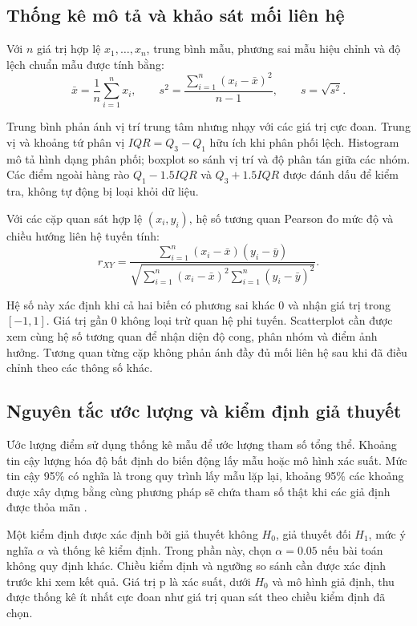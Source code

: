 \subsection{Thống kê mô tả và khảo sát mối liên hệ}

Với \(n\) giá trị hợp lệ \(x_1,\ldots,x_n\), trung bình mẫu, phương sai mẫu hiệu chỉnh và độ lệch chuẩn mẫu được tính bằng:
\nopagebreak[4]
\[
\bar{x}=\frac{1}{n}\sum_{i=1}^{n}x_i,\qquad
s^2=\frac{\sum_{i=1}^{n}(x_i-\bar{x})^2}{n-1},\qquad s=\sqrt{s^2}.
\]

Trung bình phản ánh vị trí trung tâm nhưng nhạy với các giá trị cực đoan. Trung vị và khoảng tứ phân vị \(IQR=Q_3-Q_1\) hữu ích khi phân phối lệch. Histogram mô tả hình dạng phân phối; boxplot so sánh vị trí và độ phân tán giữa các nhóm. Các điểm ngoài hàng rào \(Q_1-1.5IQR\) và \(Q_3+1.5IQR\) được đánh dấu để kiểm tra, không tự động bị loại khỏi dữ liệu.

Với các cặp quan sát hợp lệ \((x_i,y_i)\), hệ số tương quan Pearson đo mức độ và chiều hướng liên hệ tuyến tính:
\nopagebreak[4]
\[
r_{XY}=\frac{\sum_{i=1}^{n}(x_i-\bar{x})(y_i-\bar{y})}
{\sqrt{\sum_{i=1}^{n}(x_i-\bar{x})^2\sum_{i=1}^{n}(y_i-\bar{y})^2}}.
\]

Hệ số này xác định khi cả hai biến có phương sai khác 0 và nhận giá trị trong \([-1,1]\). Giá trị gần 0 không loại trừ quan hệ phi tuyến. Scatterplot cần được xem cùng hệ số tương quan để nhận diện độ cong, phân nhóm và điểm ảnh hưởng. Tương quan từng cặp không phản ánh đầy đủ mối liên hệ sau khi đã điều chỉnh theo các thông số khác.

\subsection{Nguyên tắc ước lượng và kiểm định giả thuyết}

Ước lượng điểm sử dụng thống kê mẫu để ước lượng tham số tổng thể. Khoảng tin cậy lượng hóa độ bất định do biến động lấy mẫu hoặc mô hình xác suất. Mức tin cậy 95\% có nghĩa là trong quy trình lấy mẫu lặp lại, khoảng 95\% các khoảng được xây dựng bằng cùng phương pháp sẽ chứa tham số thật khi các giả định được thỏa mãn \cite{ref2}.

Một kiểm định được xác định bởi giả thuyết không \(H_0\), giả thuyết đối \(H_1\), mức ý nghĩa \(\alpha\) và thống kê kiểm định. Trong phần này, chọn \(\alpha=0.05\) nếu bài toán không quy định khác. Chiều kiểm định và ngưỡng so sánh cần được xác định trước khi xem kết quả. Giá trị p là xác suất, dưới \(H_0\) và mô hình giả định, thu được thống kê ít nhất cực đoan như giá trị quan sát theo chiều kiểm định đã chọn.

